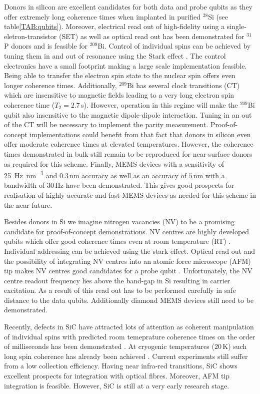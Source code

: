 Donors in silicon are excellent candidates for both data and probe qubits as they offer extremely long coherence times when implanted in purified $^{28}$Si (see table\@ \ref{TAB:qubits}). Moreover, electrical read out of high-fidelity using a single-eletron-transistor (SET) \cite{Pla2012,Pla2013,Muhonen2014} as well as optical \cite{Lo2015} read out has been demonstrated for $^{31}$P donors and is feasible for $^{209}$Bi. Control of individual spins can be achieved by tuning them in and out of resonance using the Stark effect \cite{Pica2014}. The control electronics have a small footprint making a large scale implementation feasible. Being able to transfer the electron spin state to the nuclear spin offers even longer coherence times. Additionally, $^{209}$Bi has several clock transitions (CT) which are insensitive to magnetic fields leading to a very long electron spin coherence time ($T_2=2.7\, $s). However, operation in this regime will make the $^{209}$Bi qubit also insensitive to the magnetic dipole-dipole interaction. Tuning in an out of the CT will be necessary to implement the parity measurement. Proof-of-concept implementations could benefit from that fact that donors in silicon even offer moderate coherence times at elevated temperatures. However, the coherence times demonstrated in bulk still remain to be reproduced for near-surface donors as required for this scheme.
Finally, MEMS devices with a sensitivity of \SI{25}{\hertz\per nm} and $0.3\, $nm accuracy \cite{Chu2003} as well as an accuracy of $5\, $nm with a bandwidth of $30\, $Hz have been demonstrated. This gives good prospects for realisation of highly accurate and fast MEMS devices as needed for this scheme in the near future. 


Besides donors in Si we imagine nitrogen vacancies (NV) to be a promising candidate for proof-of-concept demonstrations. NV centres are highly developed qubits \cite{Bar-Gill2013} which offer good coherence times even at room temperature (RT) \cite{Balasubramanian2009}. Individual addressing can be achieved using the stark effect. Optical read out and the possibility of integrating NV centres into an atomic force microscope (AFM) tip makes NV centres good candidates for a probe qubit \cite{Grinolds2013}. Unfortunately, the NV centre readout frequency lies above the band-gap in Si resulting in carrier excitation. As a result of this read out has to be performed carefully in safe distance to the data qubits. Additionally diamond MEMS devices still need to be demonstrated.

Recently, defects in SiC have attracted lots of attention \cite{Morello2015} as coherent manipulation of individual spins with predicted room temeprature coherence times on the order of milliseconds has been demonstrated \cite{Widmann2014}. At cryogenic temperatures ($20\, $K) such long spin coherence has already been achieved \cite{Christle2014}. Current experiments still suffer from a low collection efficiency. Having near infra-red transitions, SiC shows excellent prospects for integration with optical fibres. Moreover, AFM tip integration is feasible. However, SiC is still at a very early research stage.  


